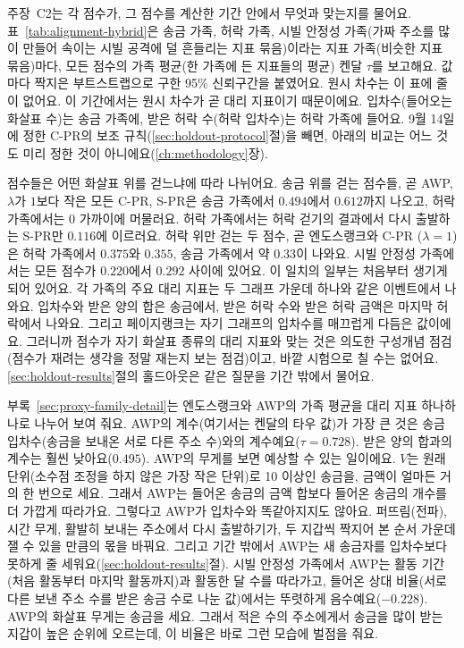 
주장~C2는 각 점수가, 그 점수를 계산한 기간 안에서 무엇과 맞는지를 물어요. 표~\ref{tab:alignment-hybrid}은 송금 가족, 허락 가족, 시빌 안정성 가족(가짜 주소를 많이 만들어 속이는 시빌 공격에 덜 흔들리는 지표 묶음)이라는 지표 가족(비슷한 지표 묶음)마다, 모든 점수의 가족 평균(한 가족에 든 지표들의 평균) 켄달 $\tau$를 보고해요. 값마다 짝지은 부트스트랩으로 구한 95\% 신뢰구간을 붙였어요. 원시 차수는 이 표에 줄이 없어요. 이 기간에서는 원시 차수가 곧 대리 지표이기 때문이에요. 입차수(들어오는 화살표 수)는 송금 가족에, 받은 허락 수(허락 입차수)는 허락 가족에 들어요. 9월 14일에 정한 C-PR의 보조 규칙(\ref{sec:holdout-protocol}절)을 빼면, 아래의 비교는 어느 것도 미리 정한 것이 아니에요(\ref{ch:methodology}장).



점수들은 어떤 화살표 위를 걷느냐에 따라 나뉘어요. 송금 위를 걷는 점수들, 곧 AWP, $\lambda$가 $1$보다 작은 모든 C-PR, S-PR은 송금 가족에서 $0.494$에서 $0.612$까지 나오고, 허락 가족에서는 0 가까이에 머물러요. 허락 가족에서는 허락 걷기의 결과에서 다시 출발하는 S-PR만 $0.116$에 이르러요. 허락 위만 걷는 두 점수, 곧 엔도스랭크와 C-PR ($\lambda=1$)은 허락 가족에서 $0.375$와 $0.355$, 송금 가족에서 약 $0.33$이 나와요. 시빌 안정성 가족에서는 모든 점수가 $0.220$에서 $0.292$ 사이에 있어요. 이 일치의 일부는 처음부터 생기게 되어 있어요. 각 가족의 주요 대리 지표는 두 그래프 가운데 하나와 같은 이벤트에서 나와요. 입차수와 받은 양의 합은 송금에서, 받은 허락 수와 받은 허락 금액은 마지막 허락에서 나와요. 그리고 페이지랭크는 자기 그래프의 입차수를 매끄럽게 다듬은 값이에요. 그러니까 점수가 자기 화살표 종류의 대리 지표와 맞는 것은 의도한 구성개념 점검(점수가 재려는 생각을 정말 재는지 보는 점검)이고, 바깥 시험으로 칠 수는 없어요. \ref{sec:holdout-results}절의 홀드아웃은 같은 질문을 기간 밖에서 물어요.

부록~\ref{sec:proxy-family-detail}는 엔도스랭크와 AWP의 가족 평균을 대리 지표 하나하나로 나누어 보여 줘요. AWP의 계수(여기서는 켄달의 타우 값)가 가장 큰 것은 송금 입차수(송금을 보내온 서로 다른 주소 수)와의 계수예요($\tau=0.728$). 받은 양의 합과의 계수는 훨씬 낮아요($0.495$). AWP의 무게를 보면 예상할 수 있는 일이에요. $V$는 원래 단위(소수점 조정을 하지 않은 가장 작은 단위)로 10 이상인 송금을, 금액이 얼마든 거의 한 번으로 세요. 그래서 AWP는 들어온 송금의 금액 합보다 들어온 송금의 개수를 더 가깝게 따라가요. 그렇다고 AWP가 입차수와 똑같아지지도 않아요. 퍼뜨림(전파), 시간 무게, 활발히 보내는 주소에서 다시 출발하기가, 두 지갑씩 짝지어 본 순서 가운데 잴 수 있을 만큼의 몫을 바꿔요. 그리고 기간 밖에서 AWP는 새 송금자를 입차수보다 못하게 줄 세워요(\ref{sec:holdout-results}절). 시빌 안정성 가족에서 AWP는 활동 기간(처음 활동부터 마지막 활동까지)과 활동한 달 수를 따라가고, 들어온 상대 비율(서로 다른 보낸 주소 수를 받은 송금 수로 나눈 값)에서는 뚜렷하게 음수예요($-0.228$). AWP의 화살표 무게는 송금을 세요. 그래서 적은 수의 주소에게서 송금을 많이 받는 지갑이 높은 순위에 오르는데, 이 비율은 바로 그런 모습에 벌점을 줘요.

